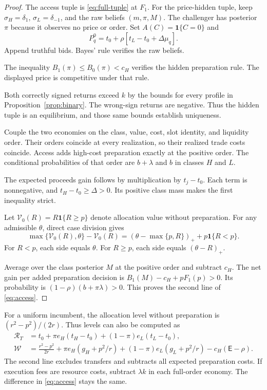 \documentclass[12pt]{article}
\newcommand{\ind}{\mathbf 1}
\newcommand{\RR}{\mathcal R_T}
\newcommand{\WW}{\mathcal W}
\begin{document}
\begin{proof}
The access tuple is \eqref{eq:full-tuple} at $F_1$.
For the price-hidden tuple, keep $\sigma_H=\delta_1$, $\sigma_L=\delta_{-1}$, and the raw beliefs $(m,\pi,M)$.
The challenger has posterior $\pi$ because it observes no price or order.
Set $A(C)=\ind\{C=0\}$ and
\[
 P_q^0=t_0+\rho[t_L-t_0+\Delta\mu_q].
\]
Append truthful bids.
Bayes' rule verifies the raw beliefs.

The inequality $B_1(\pi)\le B_0(\pi)<c_H$ verifies the hidden preparation rule.
The displayed price is competitive under that rule.

Both correctly signed returns exceed $k$ by the bounds for every profile in Proposition~\ref{prop:binary}.
The wrong-sign returns are negative.
Thus the hidden tuple is an equilibrium, and those same bounds establish uniqueness.

Couple the two economies on the class, value, cost, slot identity, and liquidity order.
Their orders coincide at every realization, so their realized trade costs coincide.
Access adds high-cost preparation exactly at the positive order.
The conditional probabilities of that order are $b+\lambda$ and $b$ in classes $H$ and $L$.

The expected proceeds gain follows by multiplication by $t_j-t_0$.
Each term is nonnegative, and $t_H-t_0\ge\Delta>0$.
Its positive class mass makes the first inequality strict.

Let $\mathcal V_0(R)=R\ind\{R\ge p\}$ denote allocation value without preparation.
For any admissible $\theta$, direct case division gives
\begin{equation}\label{eq:welfare-identity}
 \max\{\mathcal V_0(R),\theta\}-\mathcal V_0(R)
 =(\theta-\max\{p,R\})_++p\ind\{R<p\}.
\end{equation}
For $R<p$, each side equals $\theta$.
For $R\ge p$, each side equals $(\theta-R)_+$.

Average over the class posterior $M$ at the positive order and subtract $c_H$.
The net gain per added preparation decision is $B_1(M)-c_H+pF_1(p)>0$.
Its probability is $(1-\rho)(b+\pi\lambda)>0$.
This proves the second line of \eqref{eq:access}.
\end{proof}

For a uniform incumbent, the allocation level without preparation is $(r^2-p^2)/(2r)$.
Thus levels can also be computed as
\begin{align}\label{eq:welfare-level}
 \RR&=t_0+\pi e_H(t_H-t_0)+(1-\pi)e_L(t_L-t_0),\\
 \WW&=\frac{r^2-p^2}{2r}
 +\pi e_H(g_H+p^2/r)+(1-\pi)e_L(g_L+p^2/r)-c_H(\mathsf E-\rho).
 \nonumber
\end{align}
The second line excludes transfers and subtracts all expected preparation costs.
If execution fees are resource costs, subtract $\lambda k$ in each full-order economy.
The difference in \eqref{eq:access} stays the same.
\end{document}
